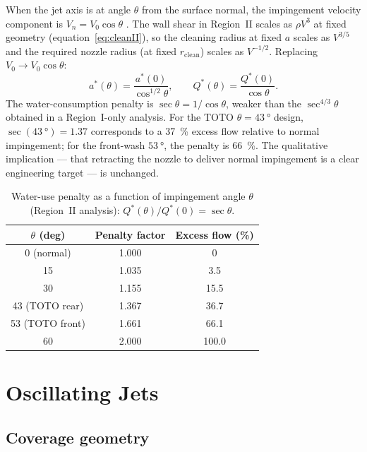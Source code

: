 \documentclass[aps,prfluids,reprint,amsmath,amssymb,floatfix]{revtex4-2}
\begin{document}
When the jet axis is at angle $\theta$ from the surface normal, the
impingement velocity component is $V_n = V_0 \cos\theta$
\citep{BeitelmalEtAl2000}. The wall
shear in Region~II scales as $\rho V^3$ at fixed geometry
(equation~\eqref{eq:cleanII}), so the cleaning radius at fixed $a$
scales as $V^{3/5}$ and the required nozzle radius (at fixed
$r_\mathrm{clean}$) scales as $V^{-1/2}$. Replacing $V_0 \to V_0\cos\theta$:
\begin{equation}
  a^*(\theta) = \frac{a^*(0)}{\cos^{1/2}\theta},
  \qquad
  Q^*(\theta) = \frac{Q^*(0)}{\cos\theta}.
  \label{eq:obliqueII}
\end{equation}
The water-consumption penalty is $\sec\theta = 1/\cos\theta$, weaker than
the $\sec^{4/3}\theta$ obtained in a Region~I-only analysis. For the
TOTO $\theta = \SI{43}{\degree}$ design,
$\sec(\SI{43}{\degree}) = 1.37$ corresponds to a \SI{37}{\percent}
excess flow relative to normal impingement; for the front-wash
$\SI{53}{\degree}$, the penalty is \SI{66}{\percent}. The qualitative
implication --- that retracting the nozzle to deliver normal
impingement is a clear engineering target --- is unchanged.

\begin{table}[h]
\centering
\caption{Water-use penalty as a function of impingement angle $\theta$
(Region~II analysis): $Q^*(\theta)/Q^*(0) = \sec\theta$.}
\label{tab:oblique}
\begin{tabular}{ccc}
\toprule
$\theta$ (deg) & Penalty factor & Excess flow (\%) \\
\midrule
0 (normal)  & 1.000 & 0 \\
15          & 1.035 & 3.5 \\
30          & 1.155 & 15.5 \\
43 (TOTO rear)  & 1.367 & 36.7 \\
53 (TOTO front) & 1.661 & 66.1 \\
60          & 2.000 & 100.0 \\
\bottomrule
\end{tabular}
\end{table}

\section{Oscillating Jets}
\label{sec:oscillating}

\subsection{Coverage geometry}
\end{document}
